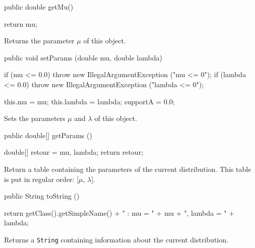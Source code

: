 \begin{code}

   public double getMu()\begin{hide} {
      return mu;
   }\end{hide}
\end{code}
 \begin{tabb} Returns the parameter $\mu$ of this object.
 \end{tabb}
\begin{code}

   public void setParams (double mu, double lambda)\begin{hide} {
      if (mu <= 0.0)
         throw new IllegalArgumentException ("mu <= 0");
      if (lambda <= 0.0)
         throw new IllegalArgumentException ("lambda <= 0");

      this.mu = mu;
      this.lambda = lambda;
      supportA = 0.0;
   }\end{hide}
\end{code}
\begin{tabb}
   Sets the parameters $\mu$ and $\lambda$ of this object.
\end{tabb}
\begin{code}

   public double[] getParams ()\begin{hide} {
      double[] retour = {mu, lambda};
      return retour;
   }\end{hide}
\end{code}
\begin{tabb}
   Return a table containing the parameters of the current distribution.
   This table is put in regular order: [$\mu$, $\lambda$].
\end{tabb}
\begin{hide}\begin{code}

   public String toString ()\begin{hide} {
      return getClass().getSimpleName() + " : mu = " + mu + ", lambda = " + lambda;
   }\end{hide}
\end{code}
\begin{tabb}
   Returns a \texttt{String} containing information about the current distribution.
\end{tabb}\end{hide}
\begin{code}\begin{hide}
}\end{hide}
\end{code}
